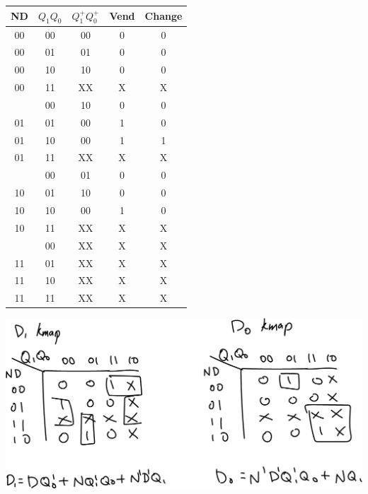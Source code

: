 \documentclass{article}
\begin{document}
    \begin{center}
        \begin{tabular} {c|c|c|c|c}
            ND & $Q_1Q_0$ & $Q_1^+Q_0^+$ & Vend & Change \\
            \hline
            00 & 00 & 00 & 0 & 0 \\
            00 & 01 & 01 & 0 & 0 \\
            00 & 10 & 10 & 0 & 0 \\
            00 & 11 & XX & X & X \\
            \hdashline
            01 & 00 & 10 & 0 & 0 \\
            01 & 01 & 00 & 1 & 0 \\
            01 & 10 & 00 & 1 & 1 \\
            01 & 11 & XX & X & X \\
            \hdashline
            10 & 00 & 01 & 0 & 0 \\
            10 & 01 & 10 & 0 & 0 \\
            10 & 10 & 00 & 1 & 0 \\
            10 & 11 & XX & X & X \\
            \hdashline
            11 & 00 & XX & X & X \\
            11 & 01 & XX & X & X \\
            11 & 10 & XX & X & X \\
            11 & 11 & XX & X & X \\
        \end{tabular}
    \end{center}

    \begin{center}
        \includegraphics[scale=0.3]{Q6_DKmaps.png}
    \end{center}
\end{document}
